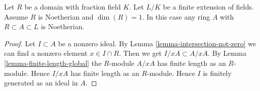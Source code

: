 \begin{lemma}
\label{lemma-krull-akizuki}
Let $R$ be a domain with fraction field $K$.
Let $L/K$ be a finite extension of fields.
Assume $R$ is Noetherian and $\dim(R) = 1$.
In this case any ring $A$ with $R \subset A \subset L$ is
Noetherian.
\end{lemma}

\begin{proof}
Let $I \subset A$ be a nonzero ideal. By
Lemma \ref{lemma-intersection-not-zero}
we can find a nonzero element $x \in I \cap R$.
Then we get $I/xA \subset A/xA$. By Lemma \ref{lemma-finite-length-global}
the $R$-module $A/xA$ has finite length as an $R$-module. Hence
$I/xA$ has finite length as an $R$-module. Hence $I$ is finitely
generated as an ideal in $A$.
\end{proof}
